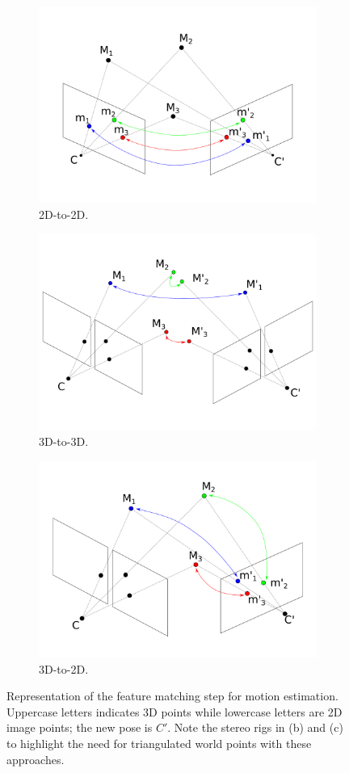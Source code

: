 \begin{figure}[ht]
	\centering
	\begin{subfigure}{\textwidth}
		\centering
		\includegraphics[width=0.5\linewidth]{img/correspondence1.pdf}
		\caption{2D-to-2D.}
        \label{fig:approach1}
	\end{subfigure}
	\begin{subfigure}{\textwidth}
		\centering
		\includegraphics[width=0.5\linewidth]{img/correspondence3.pdf}
		\caption{3D-to-3D.}
        \label{fig:approach2}
	\end{subfigure}
	\begin{subfigure}{\textwidth}
		\centering
		\includegraphics[width=0.5\linewidth]{img/correspondence2.pdf}
		\caption{3D-to-2D.}
        \label{fig:approach3}
	\end{subfigure}
	\caption{Representation of the feature matching step for motion estimation.
	Uppercase letters indicates 3D points while lowercase letters are 2D image
	points; the new pose is $C'$. Note the stereo rigs in (b) and 
	(c) to highlight the need for triangulated world points with these 
	approaches.}
    \label{fig:poseestimation_approaches}
\end{figure}

